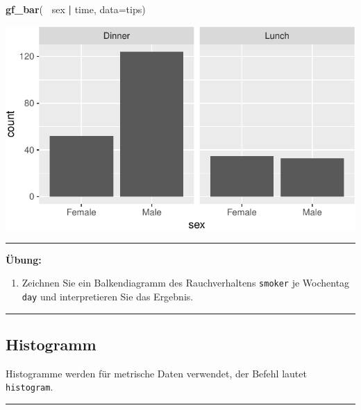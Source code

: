 \documentclass[12pt,ngerman,paper=a4,pagesize,DIV=13]{scrreprt}
\newenvironment{Shaded}{\begin{snugshade}}{\end{snugshade}}
\newcommand{\DataTypeTok}[1]{\textcolor[rgb]{0.13,0.29,0.53}{#1}}
\newcommand{\KeywordTok}[1]{\textcolor[rgb]{0.13,0.29,0.53}{\textbf{#1}}}
\newcommand{\NormalTok}[1]{#1}
\newcommand{\OperatorTok}[1]{\textcolor[rgb]{0.81,0.36,0.00}{\textbf{#1}}}
\newcommand{\StringTok}[1]{\textcolor[rgb]{0.31,0.60,0.02}{#1}}
\providecommand{\tightlist}{%
  \setlength{\itemsep}{0pt}\setlength{\parskip}{0pt}}
\begin{document}
\begin{Shaded}
\begin{Highlighting}[]
\KeywordTok{gf_bar}\NormalTok{(}\OperatorTok{~}\StringTok{ }\NormalTok{sex }\OperatorTok{|}\StringTok{ }\NormalTok{time, }\DataTypeTok{data=}\NormalTok{tips)}
\end{Highlighting}
\end{Shaded}

\includegraphics{DatenerhebungStatistik-Uebung_files/figure-latex/unnamed-chunk-43-1.pdf}

\begin{center}\rule{0.5\linewidth}{\linethickness}\end{center}

\textbf{Übung:}

\begin{enumerate}
\def\labelenumi{\arabic{enumi}.}
\tightlist
\item
  Zeichnen Sie ein Balkendiagramm des Rauchverhaltens \texttt{smoker} je
  Wochentag \texttt{day} und interpretieren Sie das Ergebnis.
\end{enumerate}

\begin{center}\rule{0.5\linewidth}{\linethickness}\end{center}

\hypertarget{histogramm}{%
\subsection{Histogramm}\label{histogramm}}

Histogramme werden für metrische Daten verwendet, der Befehl lautet
\texttt{histogram}.

\begin{center}\rule{0.5\linewidth}{\linethickness}\end{center}
\end{document}

